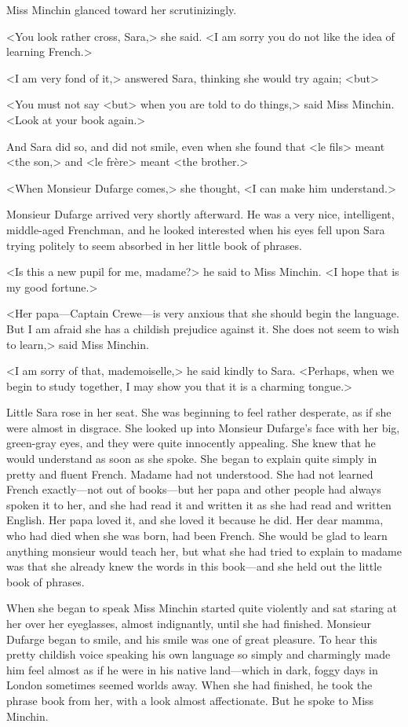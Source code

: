 Miss Minchin glanced toward her scrutinizingly.

<You look rather cross, Sara,> she said. <I am sorry you do not like the idea of learning French.>

<I am very fond of it,> answered Sara, thinking she would try again; <but\longdash>

<You must not say <but> when you are told to do things,> said Miss Minchin. <Look at your book again.>

And Sara did so, and did not smile, even when she found that <le fils> meant <the son,> and <le frère> meant <the brother.>

<When Monsieur Dufarge comes,> she thought, <I can make him understand.>

Monsieur Dufarge arrived very shortly afterward. He was a very nice, intelligent, middle-aged Frenchman, and he looked interested when his eyes fell upon Sara trying politely to seem absorbed in her little book of phrases.

<Is this a new pupil for me, madame?> he said to Miss Minchin. <I hope that is my good fortune.>

<Her papa—Captain Crewe—is very anxious that she should begin the language. But I am afraid she has a childish prejudice against it. She does not seem to wish to learn,> said Miss Minchin.

<I am sorry of that, mademoiselle,> he said kindly to Sara. <Perhaps, when we begin to study together, I may show you that it is a charming tongue.>

Little Sara rose in her seat. She was beginning to feel rather desperate, as if she were almost in disgrace. She looked up into Monsieur Dufarge's face with her big, green-gray eyes, and they were quite innocently appealing. She knew that he would understand as soon as she spoke. She began to explain quite simply in pretty and fluent French. Madame had not understood. She had not learned French exactly—not out of books—but her papa and other people had always spoken it to her, and she had read it and written it as she had read and written English. Her papa loved it, and she loved it because he did. Her dear mamma, who had died when she was born, had been French. She would be glad to learn anything monsieur would teach her, but what she had tried to explain to madame was that she already knew the words in this book—and she held out the little book of phrases.

When she began to speak Miss Minchin started quite violently and sat staring at her over her eyeglasses, almost indignantly, until she had finished. Monsieur Dufarge began to smile, and his smile was one of great pleasure. To hear this pretty childish voice speaking his own language so simply and charmingly made him feel almost as if he were in his native land—which in dark, foggy days in London sometimes seemed worlds away. When she had finished, he took the phrase book from her, with a look almost affectionate. But he spoke to Miss Minchin.

